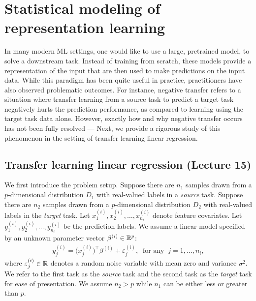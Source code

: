 \section{Statistical modeling of representation learning}

In many modern ML settings, one would like to use a large, pretrained model, to solve a downstream task.
Instead of training from scratch, these models provide a representation of the input that are then used to make predictions on the input data.
While this paradigm has been quite useful in practice, practitioners have also observed problematic outcomes.
For instance, negative transfer refers to a situation where transfer learning from a source task to predict a target task negatively hurts the prediction performance, as compared to learning using the target task data alone.
However, exactly how and why negative transfer occurs has not been fully resolved --- 
Next, we provide a rigorous study of this phenomenon in the setting of transfer learning linear regression.

\subsection{Transfer learning linear regression (Lecture 15)}

We first introduce the problem setup.
Suppose there are $n_1$ samples drawn from a $p$-dimensional distribution $D_1$ with real-valued labels in a \emph{source} task.
Suppose there are $n_2$ samples drawn from a $p$-dimensional distribution $D_2$ with real-valued labels in the \emph{target} task.
Let $x_1^{(i)}, x_2^{(i)}, \dots, x_{n_i}^{(i)}$ denote feature covariates.
Let $y_1^{(i)}, y_2^{(i)}, \dots, y_{n_i}^{(i)}$ be the prediction labels.
We assume a linear model specified by an unknown parameter vector $\beta^{(i)} \in \mathbb{R}^p$:
\begin{align*}
    y_j^{(i)} = \big(x_j^{(i)}\big)^{\top} {\beta^{(i)}} + \varepsilon_j^{(i)}, ~ \text{ for any } \  j = 1,\dots,n_i, \label{eq_linear}
\end{align*}
where $\varepsilon^{(i)}_j\in\mathbb{R}$ denotes a random noise variable with mean zero and variance $\sigma^2$.
We refer to the first task as the \emph{source} task and the second task as the \emph{target} task for ease of presentation.
We assume $n_2 > p$ while $n_1$ can be either less or greater than $p$.

